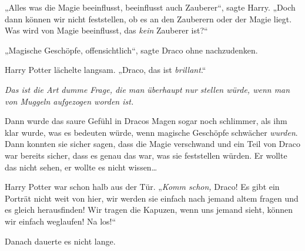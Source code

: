 „Alles was die Magie beeinflusst, beeinflusst auch Zauberer“, sagte Harry. „Doch dann können wir nicht feststellen, ob es an den Zauberern oder der Magie liegt. Was wird von Magie beeinflusst, das \emph{kein} Zauberer ist?“

„Magische Geschöpfe, offensichtlich“, sagte Draco ohne nachzudenken.

Harry Potter lächelte langsam. „Draco, das ist \emph{brillant}.“

\emph{Das ist die Art dumme Frage, die man überhaupt nur stellen würde, wenn man von Muggeln aufgezogen worden ist.}

Dann wurde das saure Gefühl in Dracos Magen sogar noch schlimmer, als ihm klar wurde, was es bedeuten würde, wenn magische Geschöpfe schwächer \emph{wurden}. Dann konnten sie sicher sagen, dass die Magie verschwand und ein Teil von Draco war bereits sicher, dass es genau das war, was sie feststellen würden. Er wollte das nicht sehen, er wollte es nicht wissen…

Harry Potter war schon halb aus der Tür. „\emph{Komm schon,} Draco! Es gibt ein Porträt nicht weit von hier, wir werden sie einfach nach jemand altem fragen und es gleich herausfinden! Wir tragen die Kapuzen, wenn uns jemand sieht, können wir einfach weglaufen! Na los!“

\later

Danach dauerte es nicht lange.

